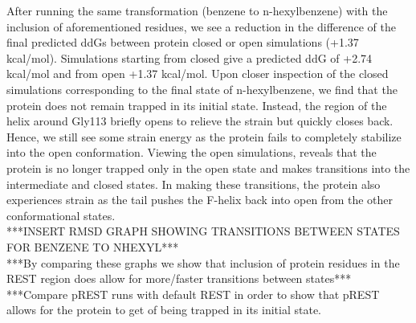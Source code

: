 \documentclass{article}
\begin{document}
After running the same transformation (benzene to n-hexylbenzene) with the inclusion of aforementioned residues, we see a reduction in the difference of the final predicted ddGs between protein closed or open simulations (+1.37 kcal/mol).
Simulations starting from closed give a predicted ddG of +2.74 kcal/mol and from open +1.37 kcal/mol.
Upon closer inspection of the closed simulations corresponding to the final state of n-hexylbenzene, we find that the protein does not remain trapped in its initial state.
Instead, the region of the helix around Gly113 briefly opens to relieve the strain but quickly closes back. 
Hence, we still see some strain energy as the protein fails to completely stabilize into the open conformation.
Viewing the open simulations, reveals that the protein is no longer trapped only in the open state and makes transitions into the intermediate and closed states.
In making these transitions, the protein also experiences strain as the tail pushes the F-helix back into open from the other conformational states.\\

***INSERT RMSD GRAPH SHOWING TRANSITIONS BETWEEN STATES FOR BENZENE TO NHEXYL***\\
***By comparing these graphs we show that inclusion of protein residues in the REST region does allow for more/faster transitions between states***\\
***Compare pREST runs with default REST in order to show that pREST allows for the protein to get of being trapped in its initial state.\\
\end{document}

